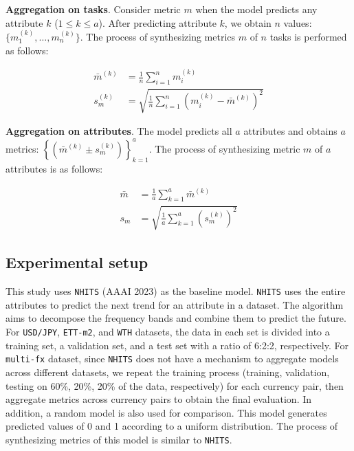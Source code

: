 \documentclass[a4paper,fleqn]{cas-sc}
\begin{document}
\vspace{1mm}

\textbf{Aggregation on tasks}. Consider metric $m$ when the model predicts any attribute $k$ ($1\leq k \leq a$). After predicting attribute $k$, we obtain $n$ values: $\{m^{(k)}_1,\dots,m^{(k)}_n\}$. The process of synthesizing metrics $m$ of $n$ tasks is performed as follows:

\begin{align}
    \bar{m}^{(k)} &= \frac{1}{n}\sum_{i=1}^n{m^{(k)}_i} \label{eq:mean_task}\\
    s^{(k)}_m &= \sqrt{\frac{1}{n} \sum_{i=1}^n{\left(m^{(k)}_i - \bar{m}^{(k)}\right)^2}} \label{eq:std_task}
\end{align}

\textbf{Aggregation on attributes}. The model predicts all $a$ attributes and obtains $a$ metrics: $\left\{ \left( \bar{m}^{(k)}\pm s^{(k)}_m \right) \right\}_{k=1}^a$. The process of synthesizing metric $m$ of $a$ attributes is as follows:

\begin{align}
    \bar{m} &= \frac{1}{a}\sum_{k=1}^a{\bar{m}^{(k)}} \label{eq:mean_att}\\
    s_m &= \sqrt{\frac{1}{a} \sum_{k=1}^a{\left(s^{(k)}_m\right)^2}} \label{eq:std:att}
\end{align}

\subsection{Experimental setup}

This study uses \verb|NHITS| (AAAI 2023) as the baseline model. \verb|NHITS| uses the entire attributes to predict the next trend for an attribute in a dataset. The algorithm aims to decompose the frequency bands and combine them to predict the future. For \verb|USD/JPY|, \verb|ETT-m2|, and \verb|WTH| datasets, the data in each set is divided into a training set, a validation set, and a test set with a ratio of 6:2:2, respectively. For \verb|multi-fx| dataset, since \verb|NHITS| does not have a mechanism to aggregate models across different datasets, we repeat the training process (training, validation, testing on 60\%, 20\%, 20\% of the data, respectively) for each currency pair, then aggregate metrics across currency pairs to obtain the final evaluation. In addition, a random model is also used for comparison. This model generates predicted values of 0 and 1 according to a uniform distribution. The process of synthesizing metrics of this model is similar to \verb|NHITS|.
\end{document}

